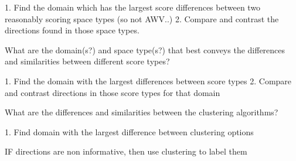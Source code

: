 1. Find the domain which has the largest score differences between two reasonably scoring space types (so not AWV..)
2. Compare and contrast the directions found in those space types. 

What are the domain(s?) and space type(s?) that best conveys the differences and similarities between different score types?

1. Find the domain with the largest differences between score types
2. Compare and contrast directions in those score types for that domain



What are the differences and similarities between the clustering algorithms?

1. Find domain with the largest difference between clustering options

IF directions are non informative, then use clustering to label them
